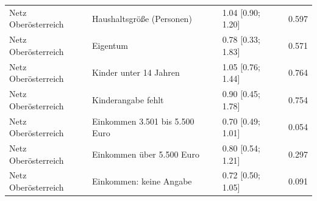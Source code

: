 \begin{table}[!h]
{\begin{tabular}[t]{llll}
Netz Oberösterreich & Haushaltsgröße (Personen) & 1.04 [0.90; 1.20] & 0.597\\
Netz Oberösterreich & Eigentum & 0.78 [0.33; 1.83] & 0.571\\
Netz Oberösterreich & Kinder unter 14 Jahren & 1.05 [0.76; 1.44] & 0.764\\
Netz Oberösterreich & Kinderangabe fehlt & 0.90 [0.45; 1.78] & 0.754\\
Netz Oberösterreich & Einkommen 3.501 bis 5.500 Euro & 0.70 [0.49; 1.01] & 0.054\\
Netz Oberösterreich & Einkommen über 5.500 Euro & 0.80 [0.54; 1.21] & 0.297\\
Netz Oberösterreich & Einkommen: keine Angabe & 0.72 [0.50; 1.05] & 0.091\\
\bottomrule
\end{tabular}}
\end{table}
